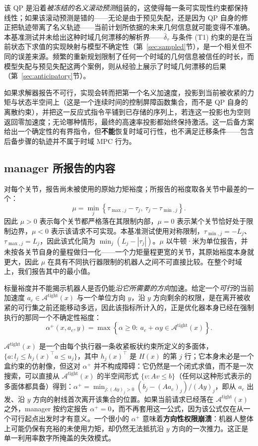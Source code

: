 \documentclass[journal]{IEEEtran}
\begin{document}
该 QP 是沿着\emph{被冻结的名义滚动预测}组装的，这使得每一条可实现性约束都保持线性；如果该滚动预测是错的——无论是由于预见失配，还是因为 QP 自身的修正把轨迹带离了名义轨迹——当前计划所依据的未来几何信息就可能变得不准确。本基准测试并未给出这种时域几何漂移的解析界——$\bar\delta_\tau$ 与条件 (T1) 约束的是在当前状态下求值的实现映射与模型不确定性（第~\ref{sec:sampled}节），是一个相关但不同的误差来源。频繁的重新规划限制了任何一个时域的几何信息被信任的时长，而模型失配与预见失配这两个案例，则从经验上展示了时域几何漂移的后果（第~\ref{sec:anticipatory}节）。

如果求解器报告不可行，实现会转而把第一个名义加速度，投影到当前被收紧的力矩与状态半空间上（这是一个连续时间的控制屏障函数集合，而不是 QP 自身的离散约束），并把这一反应式指令平铺到已存储的序列上，若连这一投影也为空则返回零加速度；无论哪种情形，最终的高速率投影都始终保持激活。这一后备方案给出一个确定性的有界指令，但\textbf{不能}恢复时域可行性，也不满足迁移条件——包含后备步骤的轨迹并不属于时域 MPC 行为。

\subsection{manager 所报告的内容}
\label{sec:reports}

对每个关节，报告尚未被使用的原始力矩裕度；所报告的裕度取各关节中最差的一个：
\[
\mu=\min_j\left\{\tau_{\max,j}-\tau_j,\ \tau_j-\tau_{\min,j}\right\}.
\]
因此 $\mu>0$ 表示每个关节都严格落在其限制内部，$\mu=0$ 表示某个关节恰好处于限制边界，$\mu<0$ 表示该请求不可实现。本基准测试使用对称限制，$\tau_{\min,j}=-L_j$、$\tau_{\max,j}=L_j$，因此该式化简为 $\min_j(L_j-|\tau_j|)$。$\mu$ 以牛顿·米为单位报告，并未按各关节自身的量程做归一化——一个力矩量程更宽的关节，其原始裕度本身就更大，因此 $\mu$ 在具有不同执行器限制的机器人之间不可直接比较。在整个时域上，我们报告其中的最小值。

标量裕度并不能揭示机器人是否仍能\emph{沿它所需要的方向}加速。给定一个\emph{可行}的当前加速度 $a_c\in\mathcal A^{\mathrm{tight}}(x)$ 与一个单位方向 $y$，沿 $y$ 方向剩余的权限，是在离开被收紧的可行集之前还能移动多远，因此该指标所计入的，正是优化器本身已经在强制执行的那同一个不确定性裕度：
\[
\alpha^{+}(x,a_c,y)=\max\left\{\alpha\ge0:\ a_c+\alpha y\in\mathcal A^{\mathrm{tight}}(x)\right\}.
\]

$\mathcal A^{\mathrm{tight}}(x)$ 是一个由每个执行器一条收紧板状约束所定义的多面体，$\{a:l_j\le h_j(x)^\top a\le u_j\}$，其中 $h_j(x)^\top$ 是 $H(x)$ 的第 $j$ 行；它本身未必是一个盒约束的仿射像，但这对 $\alpha^+$ 并不构成障碍：它仍然是一个闭式求值，而不是一次搜索，可以直接从 $\mathcal A^{\mathrm{tight}}(x)$ 的半空间形式 $\{v:Av\le b\}$（任何以这种形式表示的多面体都具备）得到：$\alpha^{+}=\min_{j:(Ay)_j>0}(b_j-(Aa_c)_j)/(Ay)_j$，即从 $a_c$ 出发、沿 $y$ 方向的射线首次离开该集合的位置。如果当前请求已经落在 $\mathcal A^{\mathrm{tight}}(x)$ 之外，manager 按约定报告 $\alpha^{+}=0$，而不再套用这一公式，因为该公式仅在从一个可行起点出发时才有意义。一个很小的 $\alpha^{+}$ 意味着\textbf{方向性权限崩溃}：机器人整体上可能仍保有充裕的未使用力矩，却仍然无法抵抗沿 $y$ 方向的一次推力。这正是单一利用率数字所掩盖的失效模式。
\end{document}
